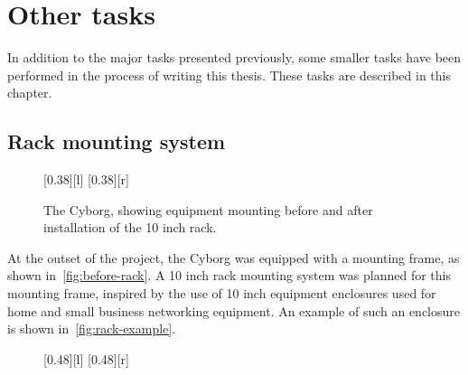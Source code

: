 \documentclass[\rootfolder/main.tex]{subfiles}
\begin{document}
\chapter{Other tasks}
\label{ch:other-tasks} %

In addition to the major tasks presented previously, some smaller tasks have been performed in the process of writing this thesis.
These tasks are described in this chapter.


\section{Rack mounting system}

\begin{figure}[h]
    \centering
    [0.38\columnwidth][l]{}
    [0.38\columnwidth][r]{}
    \caption{The Cyborg, showing equipment mounting before and after installation of the 10 inch rack.}
    \label{fig:before-after-rack}
\end{figure}

At the outset of the project, the Cyborg was equipped with a mounting frame, as shown in~\cref{fig:before-rack}.
A 10 inch rack mounting system was planned for this mounting frame, inspired by the use of 10 inch equipment enclosures used for home and small business networking equipment.
An example of such an enclosure is shown in~\cref{fig:rack-example}.

\begin{figure}[h]
    [0.48\columnwidth][l]{}
    [0.48\columnwidth][r]{}
\end{figure}
\end{document}

